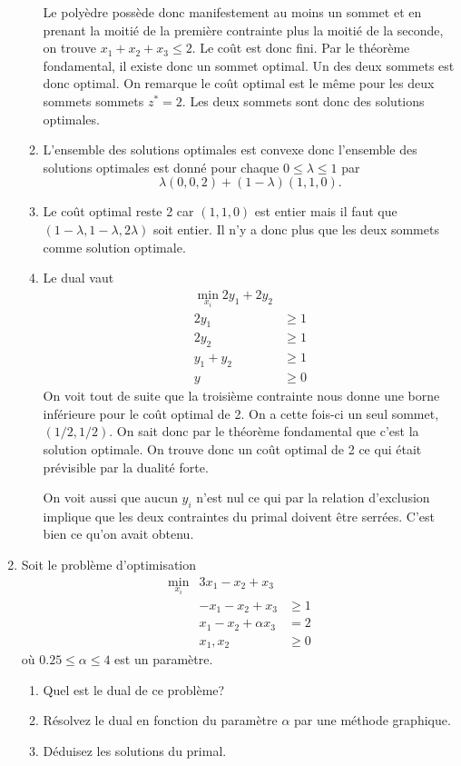 \begin{enumerate}
\begin{solution}
\begin{enumerate}
          Le polyèdre possède donc manifestement au moins un sommet et
          en prenant la moitié de la première contrainte plus la moitié
          de la seconde, on trouve $x_1 + x_2 + x_3 \leq 2$.
          Le coût est donc fini.
          Par le théorème fondamental, il existe donc un sommet optimal.
          Un des deux sommets est donc optimal.
          On remarque le coût optimal est le même pour les deux sommets
          sommets $z^* = 2$.
          Les deux sommets sont donc des solutions optimales.
        \item L'ensemble des solutions optimales est convexe donc
          l'ensemble des solutions optimales est donné pour chaque
          $0 \leq \lambda \leq 1$ par
          \[ \lambda(0,0,2) + (1-\lambda)(1,1,0). \]
        \item Le coût optimal reste 2 car $(1,1,0)$ est entier mais il faut
          que $(1-\lambda,1-\lambda,2\lambda)$ soit entier.
          Il n'y a donc plus que les deux sommets comme solution optimale.
        \item Le dual vaut
          \begin{align*}
            \min_{x_i}  2y_1 + 2y_2\\
            2y_1 & \geq 1\\
            2y_2 & \geq 1\\
            y_1 + y_2 & \geq 1\\
            y & \geq 0
          \end{align*}
          On voit tout de suite que la troisième contrainte nous donne
          une borne inférieure pour le coût optimal de 2.
          On a cette fois-ci un seul sommet, $(1/2,1/2)$.
          On sait donc par le théorème fondamental que c'est la solution
          optimale.
          On trouve donc un coût optimal de 2 ce qui était prévisible
          par la dualité forte.

          On voit aussi que aucun $y_i$ n'est nul ce qui par la relation
          d'exclusion implique que les deux contraintes du primal
          doivent être serrées. C'est bien ce qu'on avait obtenu.
      \end{enumerate}
    \end{solution}

  \item Soit le problème d'optimisation
    \begin{eqnarray*}
      \min_{x_i} & 3 x_1- x_2+ x_3 &  \\
      &-x_1 -x_2+ x_3  &\ge 1 \\
      &x_1- x_2 +\alpha x_3  &= 2 \\
      &x_1, x_2 &\ge 0
    \end{eqnarray*}
    où  $0.25\le\alpha\le4$ est un paramètre.
    \begin{enumerate}
      \item Quel est le dual de ce problème?
      \item Résolvez le dual en fonction
        du paramètre $\alpha$ par une méthode graphique.
      \item Déduisez les solutions du primal.
    \end{enumerate}



\end{enumerate}
